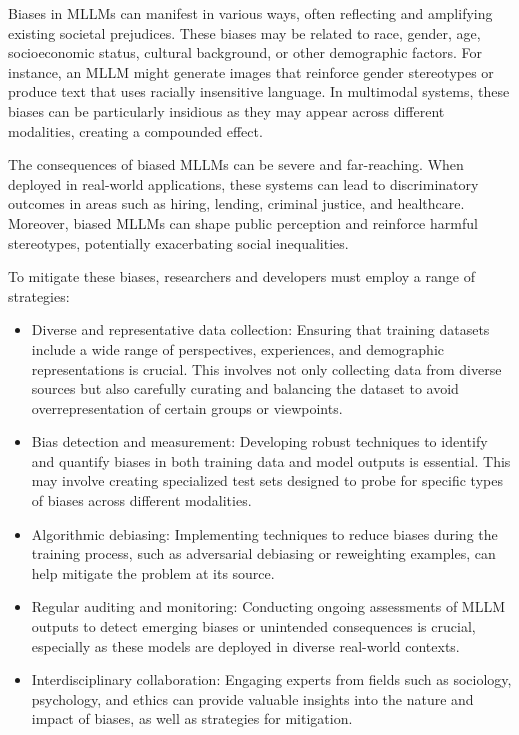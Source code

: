Biases in MLLMs can manifest in various ways, often reflecting and amplifying existing societal prejudices. These biases may be related to race, gender, age, socioeconomic status, cultural background, or other demographic factors. For instance, an MLLM might generate images that reinforce gender stereotypes or produce text that uses racially insensitive language\cite{basta2022gender}. In multimodal systems, these biases can be particularly insidious as they may appear across different modalities, creating a compounded effect\cite{magesh2024hallucination}.

The consequences of biased MLLMs can be severe and far-reaching. When deployed in real-world applications, these systems can lead to discriminatory outcomes in areas such as hiring, lending, criminal justice, and healthcare. Moreover, biased MLLMs can shape public perception and reinforce harmful stereotypes, potentially exacerbating social inequalities.

To mitigate these biases, researchers and developers must employ a range of strategies:

\begin{itemize}
\item Diverse and representative data collection\cite{cegin2024effects}: Ensuring that training datasets include a wide range of perspectives, experiences, and demographic representations is crucial. This involves not only collecting data from diverse sources but also carefully curating and balancing the dataset to avoid overrepresentation of certain groups or viewpoints.

\item Bias detection and measurement\cite{lin2024investigating}: Developing robust techniques to identify and quantify biases in both training data and model outputs is essential. This may involve creating specialized test sets designed to probe for specific types of biases across different modalities.

\item Algorithmic debiasing\cite{owens2024multi}: Implementing techniques to reduce biases during the training process, such as adversarial debiasing or reweighting examples, can help mitigate the problem at its source.

\item Regular auditing and monitoring\cite{patil2024review}: Conducting ongoing assessments of MLLM outputs to detect emerging biases or unintended consequences is crucial, especially as these models are deployed in diverse real-world contexts.

\item Interdisciplinary collaboration\cite{jiao2024navigating}: Engaging experts from fields such as sociology, psychology, and ethics can provide valuable insights into the nature and impact of biases, as well as strategies for mitigation.

\end{itemize}

